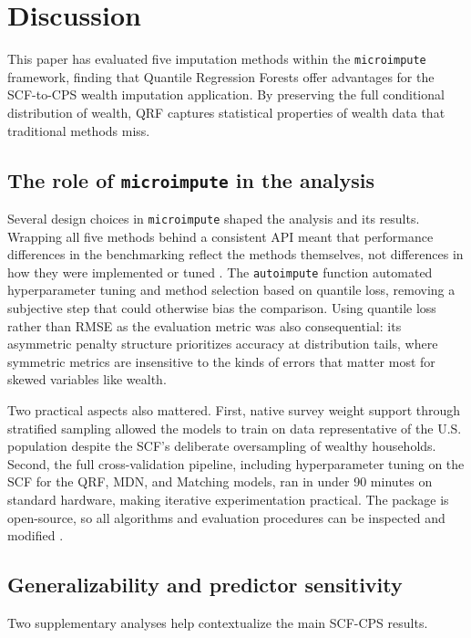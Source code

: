 \section{Discussion}\label{sec:discussion}

This paper has evaluated five imputation methods within the \texttt{microimpute} framework, finding that Quantile Regression Forests offer advantages for the SCF-to-CPS wealth imputation application. By preserving the full conditional distribution of wealth, QRF captures statistical properties of wealth data that traditional methods miss.

\subsection{The role of \texttt{microimpute} in the analysis}

Several design choices in \texttt{microimpute} shaped the analysis and its results. Wrapping all five methods behind a consistent API meant that performance differences in the benchmarking reflect the methods themselves, not differences in how they were implemented or tuned \citep{policyengine2025microimpute}. The \texttt{autoimpute} function automated hyperparameter tuning and method selection based on quantile loss, removing a subjective step that could otherwise bias the comparison. Using quantile loss rather than RMSE as the evaluation metric was also consequential: its asymmetric penalty structure prioritizes accuracy at distribution tails, where symmetric metrics are insensitive to the kinds of errors that matter most for skewed variables like wealth.

Two practical aspects also mattered. First, native survey weight support through stratified sampling allowed the models to train on data representative of the U.S. population despite the SCF's deliberate oversampling of wealthy households. Second, the full cross-validation pipeline, including hyperparameter tuning on the SCF for the QRF, MDN, and Matching models, ran in under 90 minutes on standard hardware, making iterative experimentation practical. The package is open-source, so all algorithms and evaluation procedures can be inspected and modified \citep{policyengine2025microimpute}.

\subsection{Generalizability and predictor sensitivity}

Two supplementary analyses help contextualize the main SCF-CPS results.

